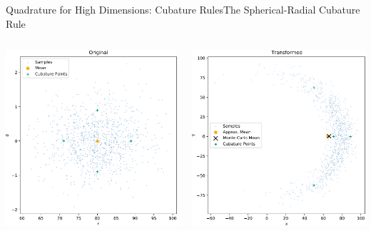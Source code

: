\documentclass[
	aspectratio=43,
	color={accentcolor=1c},
	logo=false,
	colorframetitle=true,
]{tudabeamer}
\begin{document}
		\begin{frame}{Quadrature for High Dimensions: Cubature Rules}{The Spherical-Radial Cubature Rule}
			\vspace{-0.5cm}
			\begin{columns}[c]
				\begin{column}{0.5\linewidth}
					\begin{flushright}
						\includegraphics[width=0.8\linewidth]{figures/spherical-radial-cubature-original.pdf}
					\end{flushright}
				\end{column}
				\begin{column}{0.5\linewidth}
					\begin{flushleft}
						\includegraphics[width=0.8\linewidth]{figures/spherical-radial-cubature-transformed.pdf}
					\end{flushleft}
				\end{column}
			\end{columns}


\end{frame}
\end{document}
